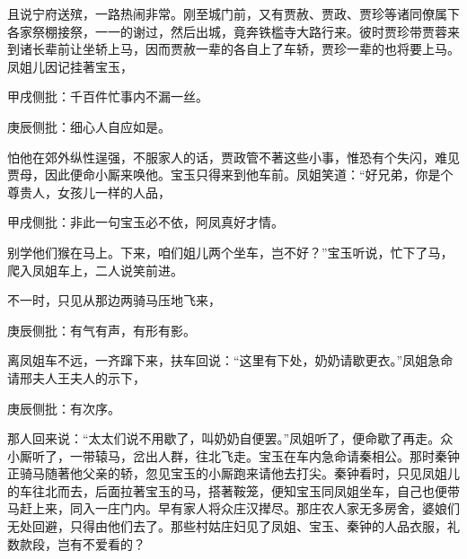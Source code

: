 \begin{parag}


    且说宁府送殡，一路热闹非常。刚至城门前，又有贾赦、贾政、贾珍等诸同僚属下各家祭棚接祭，一一的谢过，然后出城，竟奔铁槛寺大路行来。彼时贾珍带贾蓉来到诸长辈前让坐轿上马，因而贾赦一辈的各自上了车轿，贾珍一辈的也将要上马。凤姐儿因记挂著宝玉，\begin{note}甲戌侧批：千百件忙事内不漏一丝。\end{note}\begin{note}庚辰侧批：细心人自应如是。\end{note}怕他在郊外纵性逞强，不服家人的话，贾政管不著这些小事，惟恐有个失闪，难见贾母，因此便命小厮来唤他。宝玉只得来到他车前。凤姐笑道：“好兄弟，你是个尊贵人，女孩儿一样的人品，\begin{note}甲戌侧批：非此一句宝玉必不依，阿凤真好才情。\end{note}别学他们猴在马上。下来，咱们姐儿两个坐车，岂不好？”宝玉听说，忙下了马，爬入凤姐车上，二人说笑前进。
\end{parag}


\begin{parag}


    不一时，只见从那边两骑马压地飞来，\begin{note}庚辰侧批：有气有声，有形有影。\end{note}离凤姐车不远，一齐蹿下来，扶车回说：“这里有下处，奶奶请歇更衣。”凤姐急命请邢夫人王夫人的示下，\begin{note}庚辰侧批：有次序。\end{note}那人回来说：“太太们说不用歇了，叫奶奶自便罢。”凤姐听了，便命歇了再走。众小厮听了，一带辕马，岔出人群，往北飞走。宝玉在车内急命请秦相公。那时秦钟正骑马随著他父亲的轿，忽见宝玉的小厮跑来请他去打尖。秦钟看时，只见凤姐儿的车往北而去，后面拉著宝玉的马，搭著鞍笼，便知宝玉同凤姐坐车，自己也便带马赶上来，同入一庄门内。早有家人将众庄汉撵尽。那庄农人家无多房舍，婆娘们无处回避，只得由他们去了。那些村姑庄妇见了凤姐、宝玉、秦钟的人品衣服，礼数款段，岂有不爱看的？
\end{parag}


